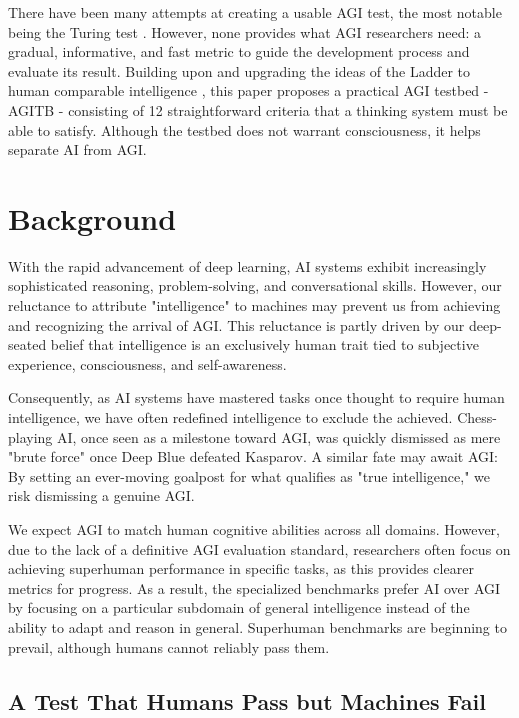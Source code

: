 \documentclass{article}
\begin{document}
	There have been many attempts at creating a usable AGI test, the most notable being the Turing test \cite{Turing1950}. However, none provides what AGI researchers need: a gradual, informative, and fast metric to guide the development process and evaluate its result. Building upon and upgrading the ideas of the Ladder to human comparable intelligence \cite{Sprogar2018}, this paper proposes a practical AGI testbed - AGITB - consisting of 12 straightforward criteria that a thinking system must be able to satisfy. Although the testbed does not warrant consciousness, it helps separate AI from AGI.
	
	
	\section{Background}
	
	With the rapid advancement of deep learning, AI systems exhibit increasingly sophisticated reasoning, problem-solving, and conversational skills. However, our reluctance to attribute "intelligence" to machines may prevent us from achieving and recognizing the arrival of AGI. This reluctance is partly driven by our deep-seated belief that intelligence is an exclusively human trait tied to subjective experience, consciousness, and self-awareness. 
	
	Consequently, as AI systems have mastered tasks once thought to require human intelligence, we have often redefined intelligence to exclude the achieved. Chess-playing AI, once seen as a milestone toward AGI, was quickly dismissed as mere "brute force" once Deep Blue defeated Kasparov. A similar fate may await AGI: By setting an ever-moving goalpost for what qualifies as "true intelligence," we risk dismissing a genuine AGI. 
	
	We expect AGI to match human cognitive abilities across all domains. However, due to the lack of a definitive AGI evaluation standard, researchers often focus on achieving superhuman performance in specific tasks, as this provides clearer metrics for progress. As a result, the specialized benchmarks prefer AI over AGI by focusing on a particular subdomain of general intelligence instead of the ability to adapt and reason in general. Superhuman benchmarks are beginning to prevail, although humans cannot reliably pass them.
	
	\subsection{A Test That Humans Pass but Machines Fail}
	
\end{document}

